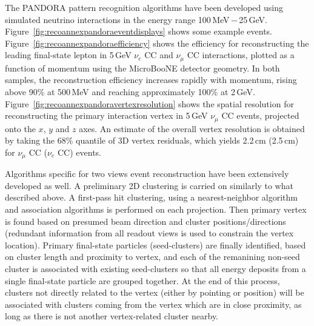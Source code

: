 The PANDORA pattern recognition algorithms have been developed
using simulated neutrino interactions in the energy range 100\,MeV\,$-$\,25\,GeV.
Figure~\ref{fig:recoannexpandoraeventdisplays} shows some example events.
Figure~\ref{fig:recoannexpandoraefficiency} shows the efficiency for reconstructing
the leading final-state lepton in 5\,GeV $\nu_{e}$ CC and $\nu_{\mu}$ CC interactions,
plotted as a function of momentum using the MicroBooNE detector geometry.
In both samples, the reconstruction efficiency increases rapidly with momentum,
rising above 90\% at 500\,MeV and reaching approximately 100\% at 2\,GeV.
Figure~\ref{fig:recoannexpandoravertexresolution} shows the spatial resolution for
reconstructing the primary interaction vertex in 5\,GeV $\nu_{\mu}$ CC events,
projected onto the $x$, $y$ and $z$ axes. An estimate of the overall vertex 
resolution is obtained by taking the 68\% quantile of 3D vertex residuals, 
which yields 2.2\,cm (2.5\,cm) for $\nu_{\mu}$ CC ($\nu_{e}$ CC) events.



Algorithms specific for two views event reconstruction have been extensively developed as well. 
A preliminary 2D clustering is carried on similarly to what described above.
A first-pass hit clustering, using a nearest-neighbor algorithm and association algorithms is performed
on each projection. Then primary vertex is found based on presumed beam direction and cluster positions/directions
(redundant information from all readout views is used to constrain the vertex location).
Primary final-state particles (seed-clusters) are finally identified, based on cluster length and proximity to vertex,
and each of the remanining non-seed cluster is associated with existing seed-clusters so that all energy deposits from a single final-state particle are grouped together.
At the end of this process, clusters not directly related to the vertex (either by pointing or position) 
will be associated with clusters coming from the vertex which are in close proximity, 
as long as there is not another vertex-related cluster nearby. 

